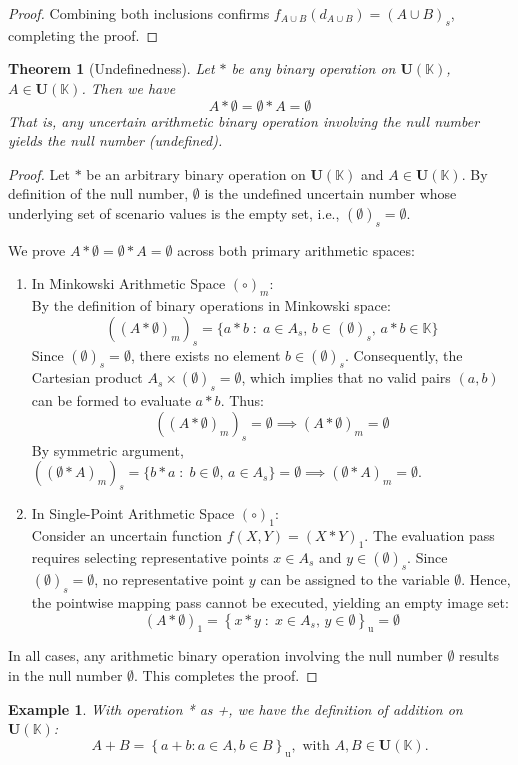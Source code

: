 \documentclass[a4paper,12pt, twoside]{memoir}
\newtheorem{theorem}{Theorem}[chapter]
\newtheorem{example}{Example}[chapter]
\newcommand{\set}[1]{\left\{#1\right\}} %
\newcommand{\s}[1]{\set{#1}_\mathrm{u}} %
\newcommand{\tsbd}[1]{\mathbf{U}(\mathbb{#1})}
\newcommand{\kgdd}[1]{\left(#1\right)_1} %
\begin{document}
\begin{proof}
	Combining both inclusions confirms $f_{A \cup B}(d_{A \cup B}) = (A \cup B)_s$, completing the proof.
\end{proof}
\begin{theorem}[Undefinedness]
	Let $*$ be any binary operation on $\tsbd{K}$, $A \in \tsbd{K}$. Then we have
	\[A * \emptyset = \emptyset * A= \emptyset\]
	That is, any uncertain arithmetic binary operation involving the null number yields the null number (undefined).
\end{theorem}

\begin{proof}
	Let $*$ be an arbitrary binary operation on $\tsbd{K}$ and $A \in \tsbd{K}$. By definition of the null number, $\emptyset$ is the undefined uncertain number whose underlying set of scenario values is the empty set, i.e., $(\emptyset)_s = \emptyset$.

	We prove $A * \emptyset = \emptyset * A = \emptyset$ across both primary arithmetic spaces:

	\begin{enumerate}[leftmargin=*]
		\item In Minkowski Arithmetic Space $(\circ)_m$: \\
		      By the definition of binary operations in Minkowski space:
		      \[
			      ((A * \emptyset)_m)_s = \{a * b \;:\; a \in A_s, \, b \in (\emptyset)_s, \, a * b \in \mathbb{K}\}
		      \]
		      Since $(\emptyset)_s = \emptyset$, there exists no element $b \in (\emptyset)_s$. Consequently, the Cartesian product $A_s \times (\emptyset)_s = \emptyset$, which implies that no valid pairs $(a, b)$ can be formed to evaluate $a * b$. Thus:
		      \[
			      ((A * \emptyset)_m)_s = \emptyset \implies (A * \emptyset)_m = \emptyset
		      \]
		      By symmetric argument, $((\emptyset * A)_m)_s = \{b * a \;:\; b \in \emptyset, \, a \in A_s\} = \emptyset \implies (\emptyset * A)_m = \emptyset$.

		\item In Single-Point Arithmetic Space $(\circ)_1$: \\
		      Consider an uncertain function $f(X, Y) = \kgdd{X * Y}$. The evaluation pass requires selecting representative points $x \in A_s$ and $y \in (\emptyset)_s$. Since $(\emptyset)_s = \emptyset$, no representative point $y$ can be assigned to the variable $\emptyset$. Hence, the pointwise mapping pass cannot be executed, yielding an empty image set:
		      \[
			      \kgdd{A * \emptyset} = \s{x * y \;:\; x \in A_s, \, y \in \emptyset} = \emptyset
		      \]
	\end{enumerate}

	In all cases, any arithmetic binary operation involving the null number $\emptyset$ results in the null number $\emptyset$. This completes the proof.
\end{proof}
\begin{example}
	With operation * as +, we have the definition of addition on $\tsbd{K}$:
	$$A + B = \s{a+b : a \in A , b \in B}, \text{ with } A,B \in \tsbd{K}.$$
\end{example}
\end{document}
